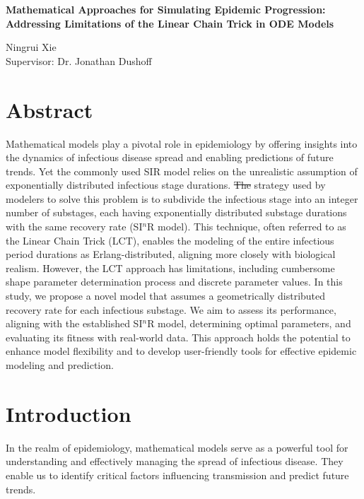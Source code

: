 \documentclass[12pt]{article}
\providecommand{\DIFadd}[1]{{\protect\color{blue}\uwave{#1}}} %
\providecommand{\DIFdel}[1]{{\protect\color{red}\sout{#1}}}                      %
\providecommand{\DIFaddbegin}{} %
\providecommand{\DIFaddend}{} %
\providecommand{\DIFdelbegin}{} %
\providecommand{\DIFdelend}{} %
\begin{document}
\begin{spacing}{1.0}
\begin{center}
    \Large
    \textbf{Mathematical Approaches for Simulating Epidemic Progression: Addressing Limitations of the Linear Chain Trick in ODE Models}

    \large
    \vspace{0.4cm}
    Ningrui Xie \\ Supervisor: Dr. Jonathan Dushoff
\end{center}
\end{spacing}

\section*{Abstract}

Mathematical models play a pivotal role in epidemiology by offering insights into the dynamics of infectious disease spread and enabling predictions of future trends. Yet the commonly used SIR model relies on the unrealistic assumption of exponentially distributed infectious stage durations. \DIFdelbegin \DIFdel{The }\DIFdelend \DIFaddbegin \DIFadd{One }\DIFaddend strategy used by modelers to solve this problem is to subdivide the infectious stage into an integer number of substages, each having exponentially distributed substage durations with the same recovery rate (SI$^n$R model). This technique, often referred to as the Linear Chain Trick (LCT), enables the modeling of the entire infectious period durations as Erlang-distributed, aligning more closely with biological realism. However, the LCT approach has limitations, including cumbersome shape parameter determination process and discrete parameter values. In this study, we propose a novel model that assumes a geometrically distributed recovery rate for each infectious substage. We aim to assess its performance, aligning with the established SI$^n$R model, determining optimal parameters, and evaluating its fitness with real-world data. This approach holds the potential to enhance model flexibility and to develop user-friendly tools for effective epidemic modeling and prediction.
\DIFdelbegin %
\DIFdelend %

\section*{Introduction}
In the realm of epidemiology, mathematical models serve as a powerful tool for understanding and effectively managing the spread of infectious disease. They enable us to identify critical factors influencing transmission and predict future trends.
\DIFdelbegin %
\DIFdelend \DIFaddbegin 
\end{document}
